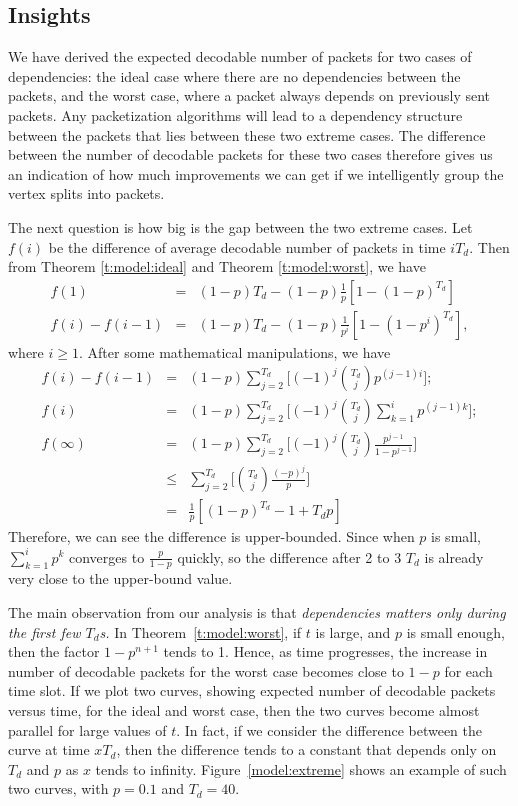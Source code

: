 \subsection{Insights}
    We have derived the expected decodable number of packets for
    two cases of dependencies: the ideal case where there are no
    dependencies between the packets, and the worst case, where
    a packet always depends on previously sent packets.  Any
    packetization algorithms will lead to a
    dependency structure between the packets that lies between
    these two extreme cases.  The difference between the number of
    decodable packets for these two cases therefore gives us an
    indication of how much improvements we can get if we intelligently
    group the vertex splits into packets.  
    
    The next question is how big is the
    gap between the two extreme cases.
    Let $f(i)$ be the difference of average decodable number of packets in time $iT_d$. Then
    from Theorem \ref{t:model:ideal} and Theorem \ref{t:model:worst}, we have
    \begin{eqnarray*}
    f(1)         &=& (1-p)T_d - (1-p)\frac{1}{p}[1-(1-p)^{T_d}]\\
        f(i)-f(i-1)  &=& (1-p)T_d - (1-p)\frac{1}{p^i}[1-(1-p^i)^{T_d}],
    \end{eqnarray*}
    where $i \geq 1$. After some mathematical manipulations, we have
    \begin{eqnarray*}
    f(i) - f(i-1) &=& (1-p)\sum_{j=2}^{T_d}\Big[(-1)^j\binom{T_d}{j}p^{(j-1)i}\Big];\\
    f(i)          &=& (1-p)\sum_{j=2}^{T_d}\Big[(-1)^{j}\binom{T_d}{j}\sum_{k=1}^i p^{(j - 1)k}\Big];\\
    f(\infty)     &=& (1-p)\sum_{j=2}^{T_d}\Big[(-1)^{j}\binom{T_d}{j}\frac{p^{j-1}}{1-p^{j-1}}\Big]\\
                  &\leq& \sum_{j=2}^{T_d}\Big[\binom{T_d}{j}\frac{(-p)^{j}}{p}\Big]\\ 
                  &=& \frac{1}{p}[(1 - p)^{T_d} - 1 + T_{d}p]
    \end{eqnarray*}
    Therefore, we can see the difference is upper-bounded.
    Since when $p$ is small, $\sum_{k=1}^i p^k$ converges to $\frac{p}{1-p}$ quickly,
    so the difference after 2 to 3 $T_d$ is already very close to the upper-bound value.
    
    
    The main observation from our analysis is that \textit{
    dependencies matters only during the first few $T_d$s.}
    In Theorem~\ref{t:model:worst}, if $t$ is large, and $p$ is small
    enough, then the factor $1-p^{n+1}$ tends to 1.  Hence, as
    time progresses, the increase in number of decodable packets
    for the worst case becomes close to $1-p$ for each time slot.
    If we plot two curves, showing expected number of decodable
    packets versus time, for the ideal and worst case, then the
    two curves become almost parallel for large values of $t$.  In fact,
    if we consider the difference between the curve at time $xT_d$,
    then the difference tends to a constant that depends only on
    $T_d$ and $p$ as $x$ tends to infinity.
    Figure~\ref{model:extreme} shows an example of such two curves, with
    $p = 0.1$ and $T_d = 40$.

